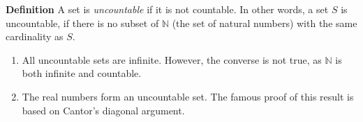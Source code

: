 \documentclass[12pt]{article}
\newcommand{\N}[0]{\mathbb{N}}
\begin{document}

{\bf Definition} A set is \emph{uncountable} if it is not countable.
In other words, a set $S$ is uncountable, if
there is no subset of $\N$ (the set of natural numbers) with the same cardinality as $S$.

\begin{enumerate}
\item All uncountable sets are infinite. However, the converse is not
true, as $\N$ is both infinite and countable.
\item The real numbers form an uncountable set. The famous proof
of this result is based on Cantor's diagonal argument.
\end{enumerate}
\end{document}

